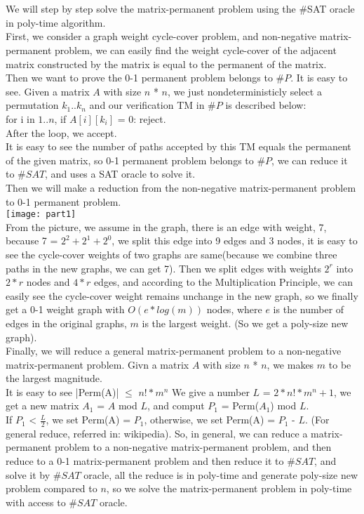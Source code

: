 \documentclass[11pt]{article}
\begin{document}
\part{}
We will step by step solve the matrix-permanent problem using the \#SAT oracle in poly-time algorithm. \\
First, we consider a graph weight cycle-cover problem, and non-negative matrix-permanent problem, we can easily find the weight cycle-cover of the adjacent matrix constructed by the matrix is equal to the permanent of the matrix. \\
Then we want to prove the 0-1 permanent problem belongs to $\#P$. It is easy to see. Given a matrix $A$ with size $n$ * $n$, we just nondeterministicly select a permutation $k_{1}..k_{n}$ and our verification TM in $\#P$ is described below: \\
for i in $1..n$, if $A[i][k_{i}]$ = 0: reject. \\
After the loop, we accept. \\
It is easy to see the number of paths accepted by this TM equals the permanent of the given matrix, so 0-1 permanent problem belongs to $\#P$, we can reduce it to $\#SAT$, and uses a SAT oracle to solve it. \\
Then we will make a reduction from the non-negative matrix-permanent problem to 0-1 permanent problem. \\ 
\texttt{[image: part1]} \\
From the picture, we assume in the graph, there is an edge with weight, 7, because 7 = $2^{2}+2^{1}+2^{0}$, we split this edge into 9 edges and 3 nodes, it is easy to see the cycle-cover weights of two graphs are same(because we combine three paths in the new graphs, we can get 7). Then we split edges with weights $2^{r}$ into $2*r$ nodes and $4*r$ edges, and according to the Multiplication Principle, we can easily see the cycle-cover weight remains unchange in the new graph, so we finally get a 0-1 weight graph with $O(e*log(m))$ nodes, where $e$ is the number of edges in the original graphs, $m$ is the largest weight. (So we get a poly-size new graph). \\
Finally, we will reduce a general matrix-permanent problem to a non-negative matrix-permanent problem. Givn a matrix $A$ with size $n$ * $n$, we makes $m$ to be the largest magnitude. \\
It is easy to see |Perm(A)| $\leq$ $n!*m^{n}$
We give a number $L$ = $2*n!*m^{n} + 1$, we get a new matrix $A_{1}$ = $A$ mod $L$, and comput $P_{1}$ = Perm($A_{1}$) mod $L$. \\ 
If $P_{1}$ < $\frac{L}{2}$, we set Perm(A) = $P_{1}$, otherwise, we set Perm(A) = $P_{1}$ - $L$. 
(For general reduce, referred in: wikipedia).
So, in general, we can reduce a matrix-permanent problem to a non-negative matrix-permanent problem, and then reduce to a 0-1 matrix-permanent problem and then reduce it to $\#SAT$, and solve it by $\#SAT$ oracle, all the reduce is in poly-time and generate poly-size new problem compared to $n$, so we solve the matrix-permanent problem in poly-time with access to $\#SAT$ oracle.
\end{document}
